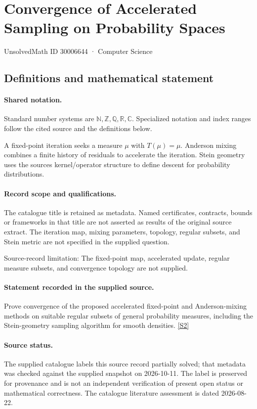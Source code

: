 \documentclass[11pt]{article}
\newcommand{\sref}[2]{\hyperlink{source:#1:#2}{[S#2]}}
\begin{document}
\setcounter{section}{30006643}
\section{Convergence of Accelerated Sampling on Probability Spaces}\label{30006644}
{\small\sffamily UnsolvedMath ID 30006644 · Computer Science}
\subsection{Definitions and mathematical statement}

\paragraph{Shared notation.}Standard number systems are $\mathbb N,\mathbb Z,\mathbb Q,\mathbb R,\mathbb C$. Specialized notation and index ranges follow the cited source and the definitions below.


A fixed-point iteration seeks a measure $\mu$ with $T(\mu)=\mu$. Anderson mixing combines a finite history of residuals to accelerate the iteration. Stein geometry uses the source\textquotesingle s kernel/operator structure to define descent for probability distributions.
\paragraph{Record scope and qualifications.}
The catalogue title is retained as metadata. Named certificates, contracts, bounds or frameworks in that title are not asserted as results of the original source extract.
The iteration map, mixing parameters, topology, regular subsets, and Stein metric are not specified in the supplied question.

Source-record limitation: The fixed-point map, accelerated update, regular measure subsets, and convergence topology are not supplied.
\paragraph{Statement recorded in the supplied source.}
Prove convergence of the proposed accelerated fixed-point and Anderson-mixing methods on suitable regular subsets of general probability measures, including the Stein-geometry sampling algorithm for smooth densities. \sref{30006644}{2}
\paragraph{Source status.}
The supplied catalogue labels this source record partially solved; that metadata was checked against the supplied snapshot on 2026-10-11. The label is preserved for provenance and is not an independent verification of present open status or mathematical correctness. The catalogue literature assessment is dated 2026-08-22.
\end{document}
